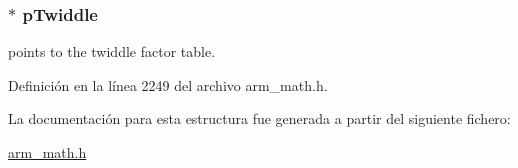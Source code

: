 \subsubsection[{\texorpdfstring{p\+Twiddle}{pTwiddle}}]{$\ast$ p\+Twiddle}\hypertarget{structarm__dct4__instance__f32_aca581481fccdff0f557f54a3ef20d967}{}\label{structarm__dct4__instance__f32_aca581481fccdff0f557f54a3ef20d967}
points to the twiddle factor table. 

Definición en la línea 2249 del archivo arm\+\_\+math.\+h.



La documentación para esta estructura fue generada a partir del siguiente fichero\+:\begin{DoxyCompactItemize}
\item 
\hyperlink{arm__math_8h}{arm\+\_\+math.\+h}\end{DoxyCompactItemize}
